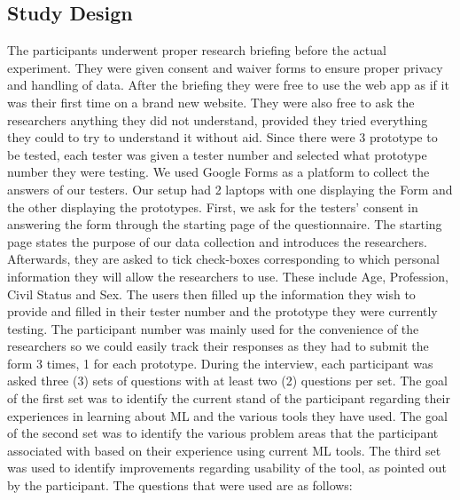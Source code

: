 \documentclass{sigchi}
\begin{document}

\subsection{Study Design}

The participants underwent proper research briefing before the actual experiment. They were given consent and waiver forms to ensure proper privacy and handling of data. After the briefing they were free to use the web app as if it was their first time on a brand new website. They were also free to ask the researchers anything they did not understand, provided they tried everything they could to try to understand it without aid. Since there were 3 prototype to be tested, each tester was given a tester number and selected what prototype number they were testing. We used Google Forms as a platform to collect the answers of our testers. Our setup had 2 laptops with one displaying the Form and the other displaying the prototypes. First, we ask for the testers' consent in answering the form through the starting page of the questionnaire. The starting page states the purpose of our data collection and introduces the researchers. Afterwards, they are asked to tick check-boxes corresponding to which personal information they will allow the researchers to use. These include Age, Profession, Civil Status and Sex. The users then filled up the information they wish to provide and filled in their tester number and the prototype they were currently testing. The participant number was mainly used for the convenience of the researchers so we could easily track their responses as they had to submit the form 3 times, 1 for each prototype. 
During the interview, each participant was asked three (3) sets of questions with at least two (2) questions per set. The goal of the first set was to identify the current stand of the participant regarding their experiences in learning about ML and the various tools they have used. The goal of the second set was to identify the various problem areas that the participant associated with based on their experience using current ML tools. The third set was used to identify improvements regarding usability of the tool, as pointed out by the participant. The questions that were used are as follows:
\end{document}
